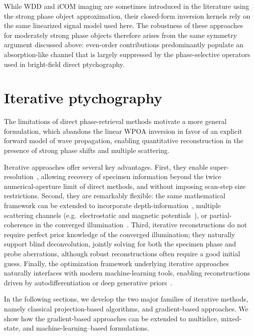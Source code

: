 \documentclass[pdflatex,sn-aps,iicol]{sn-jnl}%
\begin{document}
While WDD and iCOM imaging are sometimes introduced in the literature using the strong phase object approximation, their closed-form inversion kernels rely on the same linearized signal model used here.
The robustness of these approaches for moderately strong phase objects therefore arises from the same symmetry argument discussed above: even-order contributions predominantly populate an absorption-like channel that is largely suppressed by the phase-selective operators used in bright-field direct ptychography.

\section*{Iterative ptychography}
\label{sec:iterative}

The limitations of direct phase-retrieval methods motivate a more general formulation, which abandons the linear WPOA inversion in favor of an explicit forward model of wave propagation, enabling quantitative reconstruction in the presence of strong phase shifts and multiple scattering.

Iterative approaches offer several key advantages.
First, they enable super-resolution~\cite{Maiden_2009}, allowing recovery of specimen information beyond the twice numerical-aperture limit of direct methods, and without imposing scan-step size restrictions.
Second, they are remarkably flexible: the same mathematical framework can be extended to incorporate depth-information~\cite{Chen_2021}, multiple scattering channels (e.g.\ electrostatic and magnetic potentials~\cite{Varnavides_2023_mag}), or partial-coherence in the converged illumination~\cite{Thibault_2013}.
Third, iterative reconstructions do not require perfect prior knowledge of the converged illumination; they naturally support blind deconvolution, jointly solving for both the specimen phase and probe aberrations, although robust reconstructions often require a good initial guess.
Finally, the optimization framework underlying iterative approaches naturally interfaces with modern machine-learning tools, enabling reconstructions driven by autodifferentiation or deep generative priors~\cite{Lee_2025,Gilgenbach_2025,McCray_2025}.

In the following sections, we develop the two major families of iterative methods, namely classical projection-based algorithms, and gradient-based approaches.
We show how the gradient-based approaches can be extended to multislice, mixed-state, and machine-learning–based formulations.
\end{document}
